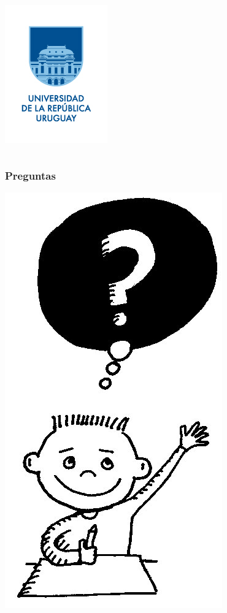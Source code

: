 \documentclass{beamer}
\begin{document}
\begin{frame}
\begin{columns}
\begin{column}{2cm}
\begin{center}
				\bigskip
				\includegraphics[scale=.3]{Imagenes/udelar.jpg}				
			\end{center}
		\end{column}
	\end{columns}
\end{frame}			



\begin{frame}
	\frametitle{Preguntas}
	\begin{center}
		\bigskip		
		\includegraphics[scale=.25]{Imagenes/preguntas.jpg}
	\end{center}
\end{frame}
\end{document}
